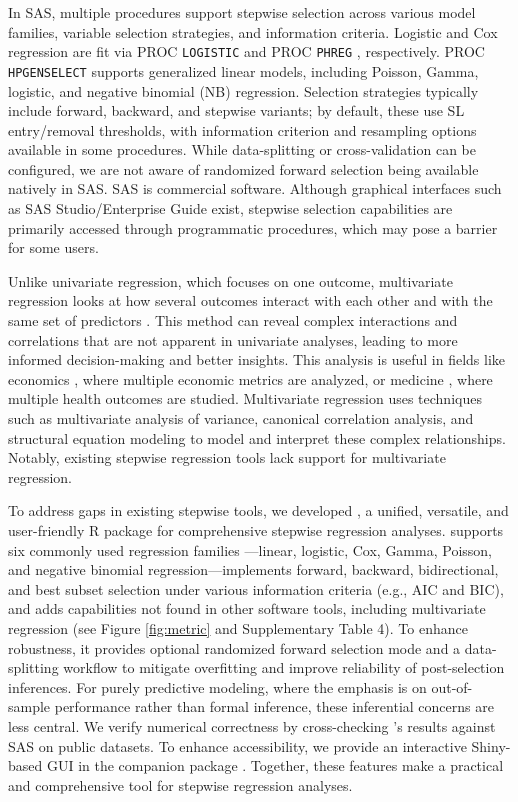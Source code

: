 In SAS, multiple procedures support stepwise selection across various model families, variable selection strategies, and information criteria. Logistic and Cox regression are fit via PROC \texttt{LOGISTIC} \citep{RN86} and PROC \texttt{PHREG} \citep{RN100}, respectively. PROC \texttt{HPGENSELECT} \citep{RN1000} supports generalized linear models, including Poisson, Gamma, logistic, and negative binomial (NB) regression. Selection strategies typically include forward, backward, and stepwise variants; by default, these use SL entry/removal thresholds, with information criterion and resampling options available in some procedures. While data-splitting or cross-validation can be configured, we are not aware of randomized forward selection being available natively in SAS. SAS is commercial software. Although graphical interfaces such as SAS Studio/Enterprise Guide exist, stepwise selection capabilities are primarily accessed through programmatic procedures, which may pose a barrier for some users.

Unlike univariate regression, which focuses on one outcome, multivariate regression looks at how several outcomes interact with each other and with the same set of predictors \citep{RN107}. This method can reveal complex interactions and correlations that are not apparent in univariate analyses, leading to more informed decision-making and better insights. This analysis is useful in fields like economics \citep{RN113, RN108}, where multiple economic metrics are analyzed, or medicine \citep{RN111, RN110, RN109}, where multiple health outcomes are studied. Multivariate regression uses techniques such as multivariate analysis of variance, canonical correlation analysis, and structural equation modeling to model and interpret these complex relationships. Notably, existing stepwise regression tools lack support for multivariate regression.

To address gaps in existing stepwise tools, we developed , a unified, versatile, and user-friendly R package for comprehensive stepwise regression analyses.  supports six commonly used regression families ---linear, logistic, Cox, Gamma, Poisson, and negative binomial regression---implements forward, backward, bidirectional, and best subset selection under various information criteria (e.g., AIC and BIC), and adds capabilities not found in other software tools, including multivariate regression (see Figure \ref{fig:metric} and Supplementary Table 4). To enhance robustness, it provides optional randomized forward selection mode and a data-splitting workflow to mitigate overfitting and improve reliability of post-selection inferences. For purely predictive modeling, where the emphasis is on out-of-sample performance rather than formal inference, these inferential concerns are less central. We verify numerical correctness by cross-checking 's results against SAS on public datasets. To enhance accessibility, we provide an interactive Shiny-based GUI in the companion package . Together, these features make  a practical and comprehensive tool for stepwise regression analyses.

